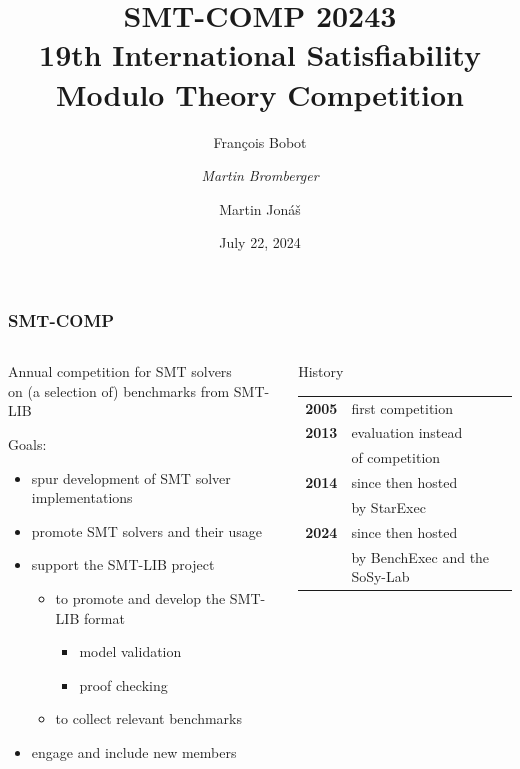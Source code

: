 \documentclass[table]{beamer}
\title{SMT-COMP 20243\\
19th International Satisfiability Modulo Theory Competition}
\author{Fran\c{c}ois Bobot \and \emph{Martin Bromberger} \and Martin Jon\'{a}\v{s} }
\date{July 22, 2024}
\institute{
CEA List, France \and
MPI für Informatik, Germany \and
Masaryk University, Czechia
}
\def\emph#1{\textcolor{MYblue}{#1}}
\begin{document}
\begin{frame}
  \titlepage
\end{frame}


\begin{frame}
  \frametitle{SMT-COMP}
  
  \begin{columns}
    \begin{column}{0.6\textwidth}
    Annual competition for \emph{SMT solvers}\\
    on (a selection of) benchmarks from \emph{SMT-LIB}
      
    \bigskip
    \bigskip    
    
    Goals:
    \begin{itemize}
      \item spur development of SMT solver implementations
      \item promote SMT solvers and their usage
      \item support the SMT-LIB project
      \begin{itemize}
        \item to promote and develop the SMT-LIB format
        \begin{itemize}
          \item model validation
          \item proof checking
        \end{itemize}
        \item to collect relevant benchmarks
      \end{itemize}
      \item engage and include new members
    \end{itemize}
    \end{column}
    \begin{column}{0.4\textwidth}
    \begin{block}{History}
      \begin{tabular}{rp{3cm}}
        \textbf{2005} & first competition \\
        \textbf{2013} & evaluation instead \\
        & of competition\\
        \textbf{2014} & since then hosted\\
        & by \emph{StarExec}\\
        \textbf{2024} & since then hosted\\
        & by \emph{BenchExec} and the \emph{SoSy-Lab} 
      \end{tabular}
    \end{block}
    \end{column}
  \end{columns}

\end{frame}
\end{document}

